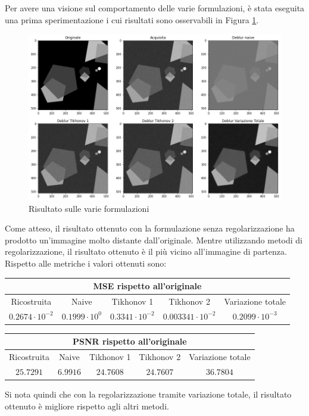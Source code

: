 \documentclass[11pt]{article}
\begin{document}
Per avere una visione sul comportamento delle varie formulazioni, è stata eseguita una prima sperimentazione i cui risultati sono osservabili in Figura \ref{fig:deblur1}.\\
\begin{figure}[H]
    \centering
    \includegraphics[width=15cm]{deblur1.png}
    \caption{Risultato sulle varie formulazioni}
    \label{fig:deblur1}
\end{figure}
Come atteso, il risultato ottenuto con la formulazione senza regolarizzazione ha prodotto un'immagine molto distante dall'originale. 
Mentre utilizzando metodi di regolarizzazione, il risultato ottenuto è il più vicino all'immagine di partenza. \\
Rispetto alle metriche i valori ottenuti sono:
\begin{center}
    \begin{tabular}{ |c|c|c|c|c| }
    \hline
    \multicolumn{5}{|c|}{MSE rispetto all'originale} \\
    \hline
    Ricostruita & Naive & Tikhonov 1 & Tikhonov 2 & Variazione totale \\ 
    $0.2674 \cdot 10^{-2}$ & $0.1999 \cdot 10^{0}$ & $0.3341 \cdot 10^{-2}$ & $0.003341 \cdot 10^{-2}$ & $0.2099 \cdot 10^{-3}$ \\ 
    \hline
    \end{tabular}
\end{center}
\begin{center}
    \begin{tabular}{ |c|c|c|c|c| }
    \hline
    \multicolumn{5}{|c|}{PSNR rispetto all'originale} \\
    \hline
    Ricostruita & Naive & Tikhonov 1 & Tikhonov 2 & Variazione totale \\ 
    $25.7291$ & $6.9916$ & $24.7608$ & $24.7607$ & $36.7804$ \\ 
    \hline
    \end{tabular}
\end{center}
Si nota quindi che con la regolarizzazione tramite variazione totale, il risultato ottenuto è migliore rispetto agli altri metodi.
\end{document}

